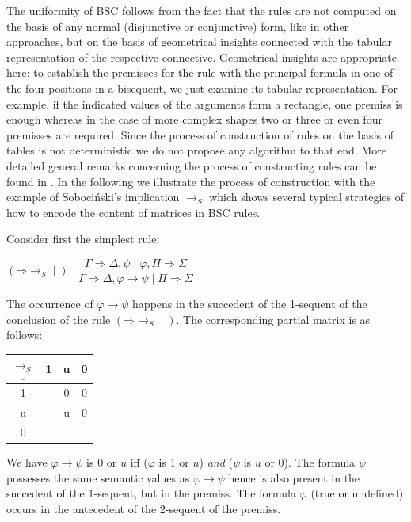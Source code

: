 \documentclass[10pt,a4paper]{article}
\theoremstyle{definition}
\newcommand{\3}{\vspace{.3in}}
\newcommand{\2}{\vspace{.2in}}
\newcommand{\1}{\vspace{.1in}}
\newcommand{\5}{\vspace{.05in}}
\begin{document}
The uniformity of BSC follows from the fact that the rules are
not computed on the basis of any normal (disjunctive or conjunctive) form,
like in other approaches, but on the basis of geometrical insights connected with the tabular representation of the
respective connective. Geometrical insights are appropriate here: to establish the
premisses for the rule with the principal formula in one of the four positions in
a bisequent, we just examine its tabular representation. For
example, if the indicated values of the arguments form a rectangle, one premiss is
enough whereas in the case of more complex shapes two or three or even four premisses are
required.
Since the process of construction of rules on the basis of tables is not deterministic
we do not propose any algorithm to that end. More detailed general remarks concerning the process of constructing rules can be found in \cite{Indrzejczak3}. In the following we illustrate 
the process of construction with the example of Soboci\'nski's implication $ \rightarrow_S $ which shows several typical strategies of how to encode the content of matrices in BSC rules.

Consider first the simplest rule:


\begin{flushleft}
	$(\mathord{\Rightarrow}\mathord{\rightarrow_S}\mid)$ \, $\dfrac{\Gamma
		\Rightarrow \Delta, \psi \mid \varphi, \Pi\Rightarrow\Sigma}{\Gamma\Rightarrow\Delta, \varphi\rightarrow\psi \mid \Pi\Rightarrow\Sigma}$
\end{flushleft} 

The occurrence of $\varphi\rightarrow\psi$ happens in the succedent of the 1-sequent of the conclusion of the rule $(\mathord{\Rightarrow}\mathord{\rightarrow_S}\mid)$.
The corresponding partial matrix is as follows:

\1

\begin{tabular}{|c|ccc|}
	\hline
	$\underline{\rightarrow_S} $ & 1 & u & 0 \\
	\hline
	1 &  & 0 & 0 \\
	u &  & u & 0 \\
	0 &  &  &  \\
	\hline
\end{tabular} 

\1

We have $\varphi\rightarrow\psi$ is 0 or $u$ iff ($\varphi$ is 1 or $u$) \textit{and} ($\psi$ is $u$ or 0).  The formula $ \psi $ possesses the same semantic values as $\varphi\rightarrow\psi$ hence is also present in the succedent of the 1-sequent, but in the premiss. The formula $ \varphi $ (true or undefined) occurs in the antecedent of the 2-sequent of the premiss.
\end{document}
